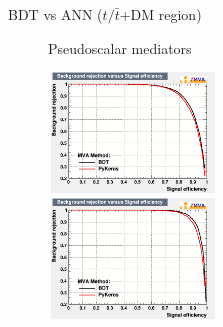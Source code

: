 \documentclass[8pt]{beamer}
\begin{document}
\begin{frame}{BDT vs ANN ($t/\bar t$+DM region)}
\begin{figure}[htbp]
\begin{block}{ \centering Pseudoscalar mediators}\end{block}
\begin{minipage}[b]{.49\textwidth}
\begin{center}
\includegraphics[width=4.5cm, height=3.2cm]{figs/ROC_pseudo100_ST.png}
\end{center}
\end{minipage} \hfill
\begin{minipage}[b]{.49\textwidth}
\begin{center}
\includegraphics[width=4.5cm, height=3.2cm]{figs/ROC_pseudo500_ST.png}
\end{center}
\end{minipage} \hfill

\label{fig:ROC_TTbar}
\end{figure}
\end{frame}
\end{document}
